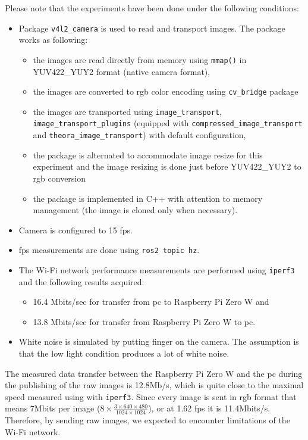 Please note that the experiments have been done under the following conditions:
\begin{itemize}
    \item Package \texttt{v4l2\_camera} is used to read and transport images. The package works as following:
        \begin{itemize}
            \item the images are read directly from memory using \texttt{mmap()} in YUV422\_YUY2 format (native camera format),
            \item the images are converted to \ac{rgb} color encoding using \texttt{cv\_bridge} package
            \item the images are transported using \texttt{image\_transport}, \texttt{image\_transport\_plugins} (equipped with \texttt{compressed\_image\_transport} and \texttt{theora\_image\_transport}) with default configuration,
            \item the package is alternated to accommodate image resize for this experiment and the image resizing is done just before YUV422\_YUY2 to \ac{rgb} conversion
            \item the package is implemented in C++ with attention to memory management (the image is cloned only when necessary).
        \end{itemize}
    \item Camera is configured to 15 \ac{fps}.
    \item \ac{fps} measurements are done using \texttt{ros2 topic hz}.
    \item The Wi-Fi network performance measurements are performed using \texttt{iperf3} and the following results acquired:
        \begin{itemize}
            \item 16.4 Mbits/sec for transfer from \ac{pc} to Raspberry Pi Zero W and
            \item 13.8 Mbits/sec for transfer from Raspberry Pi Zero W to \ac{pc}.
        \end{itemize}
    \item White noise is simulated by putting finger on the camera.
    The assumption is that the low light condition produces a lot of white noise. 
\end{itemize}

The measured data transfer between the Raspberry Pi Zero W and the \ac{pc} during the publishing of the raw images is 12.8Mb/s, which is quite close to the maximal speed measured using with \texttt{iperf3}.
Since every image is sent in \ac{rgb} format that means 7Mbits per image ($ 8 \times \frac{ 3 \times 640 \times 480 }{1024 \times 1024}$), or at 1.62 \ac{fps} it is 11.4Mbits/s.
Therefore, by sending raw images, we expected to encounter limitations of the Wi-Fi network.

